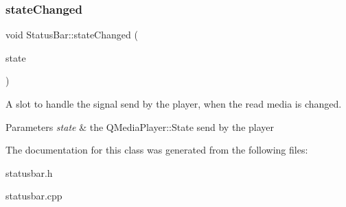 \subsubsection{\texorpdfstring{state\+Changed}{stateChanged}}
{\footnotesize\ttfamily void Status\+Bar\+::state\+Changed (\begin{DoxyParamCaption}\item[{Q\+Media\+Player\+::\+State}]{state }\end{DoxyParamCaption})\hspace{0.3cm}{\ttfamily [slot]}}



A slot to handle the signal send by the player, when the read media is changed. 


\begin{DoxyParams}{Parameters}
{\em state} & the Q\+Media\+Player\+::\+State send by the player \\
\hline
\end{DoxyParams}


The documentation for this class was generated from the following files\+:\begin{DoxyCompactItemize}
\item 
statusbar.\+h\item 
statusbar.\+cpp\end{DoxyCompactItemize}

